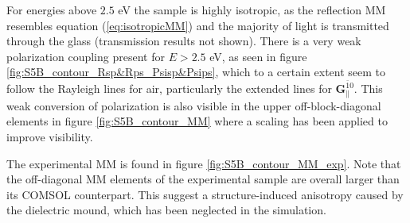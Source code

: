 For energies above $2.5$ eV the sample is highly isotropic, as the reflection MM resembles equation (\ref{eq:isotropicMM}) and the majority of light is transmitted through the glass (transmission results not shown). There is a very weak polarization coupling present for $E>2.5$ eV, as seen in figure \ref{fig:S5B_contour_Rsp&Rps_Psisp&Psips}, which to a certain extent seem to follow the Rayleigh lines for air, particularly the extended lines for $\mathbf{G}_\parallel^{\bar{1}0}$. This weak conversion of polarization is also visible in the upper off-block-diagonal elements in figure \ref{fig:S5B_contour_MM} where a scaling has been applied to improve visibility. 



The experimental MM is found in figure \ref{fig:S5B_contour_MM_exp}. Note that the off-diagonal MM elements of the experimental sample are overall larger than its COMSOL counterpart. This suggest a structure-induced anisotropy caused by the dielectric mound, which has been neglected in the simulation.



